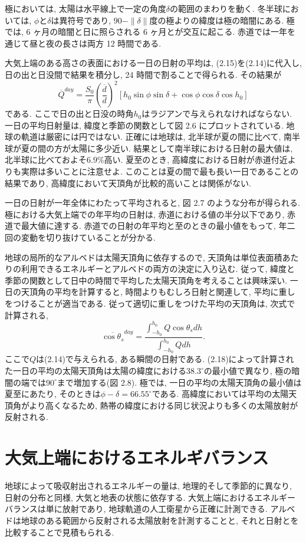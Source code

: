 \documentclass[a4j,12pt,openbib,oneside,dvipdfmx]{jbook}
\begin{document}
極においては, 太陽は水平線上で一定の角度$\delta$の範囲のまわりを動く.
冬半球においては, $\phi$と$\delta$は異符号であり, $90-\|\delta\|$度の極よりの緯度は極の暗闇にある.
極では, 6 ヶ月の暗闇と日に照らされる 6 ヶ月とが交互に起こる. 赤道では一年を通じて昼と夜の長さは両方 12 時間である.
\par
大気上端のある高さの表面における一日の日射の平均は, (2.15)を(2.14)に代入し, 日の出と日没間で結果を積分し, 24 時間で割ることで得られる. 
その結果が
\begin{equation}
  \overline{Q}^{day}=\frac{S_0}{\pi}\left(\frac{\overline{d}}{d}\right)^2\left[h_0\sin\phi\sin\delta+\cos\phi\cos\delta\cos{h_0}\right]
\end{equation}
である. ここで日の出と日没の時角$h_0$はラジアンで与えられなければならない. 一日の平均日射量は, 緯度と季節の関数として図 2.6 にプロットされている.
地球の軌道は厳密には円ではない. 正確には地球は, 北半球が夏の間に比べて, 南半球が夏の間の方が太陽に多少近い. 
結果として南半球における日射の最大値は, 北半球に比べておよそ$6.9\%$高い.
夏至のとき, 高緯度における日射が赤道付近よりも実際は多いことに注意せよ.
このことは夏の間で最も長い一日であることの結果であり, 高緯度において天頂角が比較的高いことは関係がない.
\par
一日の日射が一年全体にわたって平均されると, 図 2.7 のような分布が得られる.
極における大気上端での年平均の日射は, 赤道における値の半分以下であり, 赤道で最大値に達する. 赤道での日射の年平均と至のときの最小値をもって, 年二回の変動を切り抜けていることが分かる.
\par
地球の局所的なアルベドは太陽天頂角に依存するので, 天頂角は単位表面積あたりの利用できるエネルギーとアルベドの両方の決定に入り込む. 
従って, 緯度と季節の関数として日中の時間で平均した太陽天頂角を考えることは興味深い.
一日の天頂角の平均を計算すると, 時間よりもむしろ日射と関連して, 平均に重しをつけることが適当である. 
従って適切に重しをつけた平均の天頂角は, 次式で計算される,
\begin{equation}
  \overline{\cos{\theta_s}}^{day}=\frac{\int_{-h_0}^{h_0} Q\cos{\theta_s}dh}{\int_{-h_0}^{h_0} Qdh }.
\end{equation}
ここで$Q$は(2.14)で与えられる, ある瞬間の日射である.
(2.18)によって計算された一日の平均の太陽天頂角は太陽の緯度における$38.3^\circ$の最小値で異なり, 極の暗闇の端では$90^\circ$まで増加する(図 2.8).
極では, 一日の平均の太陽天頂角の最小値は夏至にあたり, そのときは$\phi-\delta=66.55^\circ$である.
高緯度においては平均の太陽天頂角がより高くなるため, 熱帯の緯度における同じ状況よりも多くの太陽放射が反射される.

\newpage
{}
\section{大気上端におけるエネルギバランス}
地球によって吸収射出されるエネルギーの量は, 地理的そして季節的に異なり, 日射の分布と同様, 大気と地表の状態に依存する.
大気上端におけるエネルギーバランスは単に放射であり, 地球軌道の人工衛星から正確に計測できる.
アルベドは地球のある範囲から反射される太陽放射を計測することと, それと日射とを比較することで見積もられる.
\end{document}
